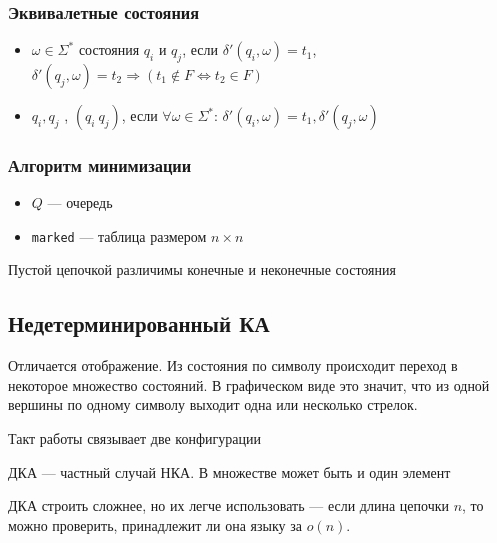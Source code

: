 \documentclass[a4paper, 14pt]{extarticle}
\begin{document}
\subsubsection*{Эквивалетные состояния}
\begin{itemize}
    \item $\omega \in \Sigma^*$  состояния $q_i$ и $q_j$, если $\delta'(q_i, \omega) = t_1$, $\delta'(q_j, \omega) = t_2 \Rightarrow (t_1 \notin F \Longleftrightarrow t_2 \in F )$
    \item $q_i, q_j$ , $(q_i ~ q_j)$, если $\forall \omega \in \Sigma^*$: $\delta'(q_i, \omega) = t_1, \delta'(q_j, \omega)$ %
\end{itemize}

\subsubsection*{Алгоритм минимизации} %
\begin{itemize}
    \item $Q$ --- очередь
    \item \texttt{marked} --- таблица размером $n \times n$
\end{itemize}

Пустой цепочкой различимы конечные и неконечные состояния

\subsection{Недетерминированный КА}
Отличается отображение. Из состояния по символу происходит переход в некоторое множество состояний. В графическом виде это значит, что из одной вершины по одному символу выходит одна или несколько стрелок.

Такт работы связывает две конфигурации

ДКА --- частный случай НКА. В множестве может быть и один элемент

ДКА строить сложнее, но их легче использовать --- если длина цепочки $n$, то можно проверить, принадлежит ли она языку за $o(n)$.
\end{document}
